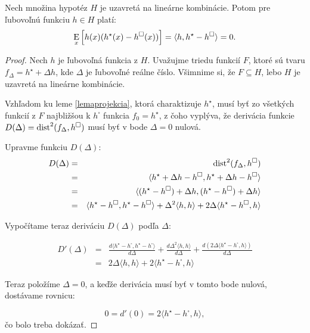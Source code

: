 \begin{lemma}
  \label{lemmanula}
  Nech množina hypotéz $H$ je uzavretá na lineárne kombinácie. 
  Potom pre ľubovoľnú funkciu $h\in H$ platí:
  $$\operatorname*{\mathrm{E}}_{x}\left[h(x)(h^{\star}(x)-h^{\square}(x))\right] =
     \langle h, h^{\star}-h^{\square} \rangle = 0.$$
\end{lemma}


\begin{proof}
  Nech $h$ je ľubovoľná funkcia z $H$. Uvažujme triedu funkcií $F$,
  ktoré sú tvaru $f_\Delta = h^\star + \Delta h$, kde $\Delta$ je
  ľubovoľné reálne číslo. Všimnime si, že $F\subseteq H$, lebo $H$ je uzavretá
  na lineárne kombinácie.

  Vzhľadom ku leme \ref{lemaprojekcia}, ktorá charaktizuje $h^\star$,
  musí byť zo všetkých funkcií z $F$ najbližšou k $h^\square$ funkcia
  $f_0=h^\star$, z čoho vyplýva, že derivácia funkcie
  $D(\Delta)=\text{dist}^2(f_\Delta,h^\square)$ musí byť v bode $\Delta=0$ nulová.

  Upravme funkciu $D(\Delta)$:
  \begin{eqnarray}
    D(\Delta) & = & \text{dist}^2(f_\Delta,h^\square)\\
    & = & \langle h^\star+\Delta h-h^\square,h^\star+\Delta h-h^\square \rangle\\
    & = & \langle (h^\star-h^\square)+\Delta h,(h^\star-h^\square)+\Delta h \rangle\\
    & = &  \langle h^\star-h^\square, h^\star-h^\square \rangle +
    \Delta^2 \langle h, h \rangle +
    2\Delta \langle h^\star-h^\square, h\rangle
  \end{eqnarray}

  Vypočítame teraz deriváciu $D(\Delta)$ podľa $\Delta$:

  \begin{eqnarray}
    D'(\Delta)& = & \frac{d\langle h^\star-h^\square, h^\star-h^\square \rangle}{d\Delta} + \frac{d \Delta^2 \langle h, h \rangle}{d\Delta} +
    \frac{d(2\Delta \langle h^\star-h^\square, h\rangle)}{d\Delta}\\
    & = & 2\Delta \langle h, h \rangle + 2\langle h^\star-h^\square, h\rangle
  \end{eqnarray}

  \noindent
  Teraz položíme $\Delta=0$, a keďže derivácia musí byť v tomto bode nulová,
  dostávame rovnicu:

  \begin{equation}
    0 = d'(0) = 2\langle  h^\star-h^\square,h \rangle,
  \end{equation}
  čo bolo treba dokázať.
\end{proof}

